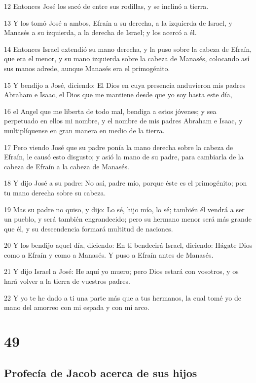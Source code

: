 12 Entonces José los sacó de entre sus rodillas, y se inclinó a tierra.

13 Y los tomó José a ambos, Efraín a su derecha, a la izquierda de Israel, y Manasés a su izquierda, a la derecha de Israel; y los acercó a él.

14 Entonces Israel extendió su mano derecha, y la puso sobre la cabeza de Efraín, que era el menor, y su mano izquierda sobre la cabeza de Manasés, colocando así sus manos adrede, aunque Manasés era el primogénito.

15 Y bendijo a José, diciendo: El Dios en cuya presencia anduvieron mis padres Abraham e Isaac, el Dios que me mantiene desde que yo soy hasta este día,

16 el Angel que me liberta de todo mal, bendiga a estos jóvenes; y sea perpetuado en ellos mi nombre, y el nombre de mis padres Abraham e Isaac, y multiplíquense en gran manera en medio de la tierra.

17 Pero viendo José que su padre ponía la mano derecha sobre la cabeza de Efraín, le causó esto disgusto; y asió la mano de su padre, para cambiarla de la cabeza de Efraín a la cabeza de Manasés.

18 Y dijo José a su padre: No así, padre mío, porque éste es el primogénito; pon tu mano derecha sobre su cabeza.

19 Mas su padre no quiso, y dijo: Lo sé, hijo mío, lo sé; también él vendrá a ser un pueblo, y será también engrandecido; pero su hermano menor será más grande que él, y su descendencia formará multitud de naciones.

20 Y los bendijo aquel día, diciendo: En ti bendecirá Israel, diciendo: Hágate Dios como a Efraín y como a Manasés. Y puso a Efraín antes de Manasés.

21 Y dijo Israel a José: He aquí yo muero; pero Dios estará con vosotros, y os hará volver a la tierra de vuestros padres.

22 Y yo te he dado a ti una parte más que a tus hermanos, la cual tomé yo de mano del amorreo con mi espada y con mi arco.

\chapter{49}

\section{Profecía de Jacob acerca de sus hijos}

